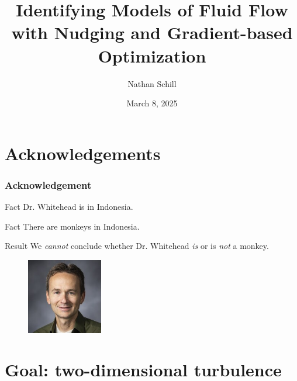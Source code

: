 \documentclass{beamer}
\title{Identifying Models of Fluid Flow with Nudging and Gradient-based Optimization}
\author{Nathan Schill}
\institute{Brigham Young University}
\date{March 8, 2025}
\newcommand\blfootnote[1]{%
  \begingroup
  \renewcommand\thefootnote{}\footnote{#1}%
  \addtocounter{footnote}{-1}%
  \endgroup
}
\begin{document}
\frame{\titlepage}

\section{Acknowledgements}

\begin{frame}
  \frametitle{Acknowledgement}
  \begin{block}{Fact}
    Dr. \!Whitehead is in Indonesia.
  \end{block}
  \pause
  \begin{block}{Fact}
    There are monkeys in Indonesia.
  \end{block}
  \pause
  \begin{block}{Result}
    We \textit{cannot} conclude whether Dr.\! Whitehead \textit{is} or is
    \textit{not} a monkey.
  \end{block}
  \begin{figure}
    \centering
    \includegraphics[height=1.3in, keepaspectratio]{jared.jpg}
  \end{figure}
\end{frame}

\section{Goal: two-dimensional turbulence}

\end{document}
